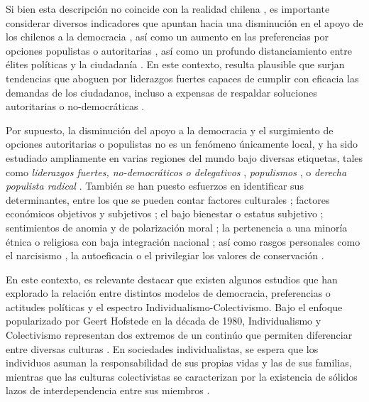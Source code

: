 \documentclass[12pt,twoside]{templates/facsothesis}
\begin{document}
Si bien esta descripción no coincide con la realidad chilena \citep{odonnell1994}, es importante considerar diversos indicadores que apuntan hacia una disminución en el apoyo de los chilenos a la democracia \citep{cep}, así como un aumento en las preferencias por opciones populistas o autoritarias \citep{cadem2023, cerc-mori, diaz2023}, así como un profundo distanciamiento entre élites políticas y la ciudadanía \citep{luna2016}. En este contexto, resulta plausible que surjan tendencias que aboguen por liderazgos fuertes capaces de cumplir con eficacia las demandas de los ciudadanos, incluso a expensas de respaldar soluciones autoritarias o no-democráticas \citep{carlin2018}.

Por supuesto, la disminución del apoyo a la democracia y el surgimiento de opciones autoritarias o populistas no es un fenómeno únicamente local, y ha sido estudiado ampliamente en varias regiones del mundo bajo diversas etiquetas, tales como \emph{liderazgos fuertes, no-democráticos o delegativos} \citep{carlin2011, carlin2018, crimston2022, kang2018, lima2021, selvanathan2022, xuereb2021}, \emph{populismos} \citep{baro2022, gidron2020, nowakowski2021}, o \emph{derecha populista radical} \citep{diaz2023, donovan2019, donovan2021}. También se han puesto esfuerzos en identificar sus determinantes, entre los que se pueden contar factores culturales \citep{lima2021, marchlewska2022, selvanathan2022}; factores económicos objetivos y subjetivos \citep{arikan2019, rico2020, wu2019, xuereb2021}; el bajo bienestar o estatus subjetivo \citep{gidron2020, nowakowski2021}; sentimientos de anomia y de polarización moral \citep{crimston2022}; la pertenencia a una minoría étnica o religiosa con baja integración nacional \citep{eskelinen2020}; así como rasgos personales como el narcisismo \citep{marchlewska2019}, la autoeficacia \citep{rico2020} o el privilegiar los valores de conservación \citep{baro2022}.

En este contexto, es relevante destacar que existen algunos estudios que han explorado la relación entre distintos modelos de democracia, preferencias o actitudes políticas y el espectro Individualismo-Colectivismo. Bajo el enfoque popularizado por Geert Hofstede en la década de 1980, Individualismo y Colectivismo representan dos extremos de un continúo que permiten diferenciar entre diversas culturas \citep{oyserman2002}. En sociedades individualistas, se espera que los individuos asuman la responsabilidad de sus propias vidas y las de sus familias, mientras que las culturas colectivistas se caracterizan por la existencia de sólidos lazos de interdependencia entre sus miembros \citep{yoon2010}.
\end{document}
